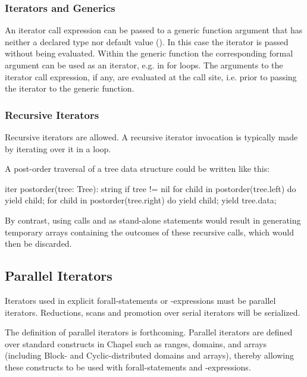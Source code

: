 \subsubsection{Iterators and Generics}
\label{Iterators_and_Generics}

An iterator call expression can be passed to a generic function argument that
has neither a declared type nor default value
().
In this case the iterator is passed without being evaluated.
Within the generic function the corresponding formal argument
can be used as an iterator, e.g. in for loops.
The arguments to the iterator call expression, if any, are evaluated
at the call site, i.e. prior to passing the iterator to the generic function.

\subsubsection{Recursive Iterators}
\label{Recursive_Iterators}

Recursive iterators are allowed. A recursive iterator invocation is
typically made by iterating over it in a loop.


\begin{example}
A post-order traversal of a tree data structure could be written like this:
\begin{chapel}
iter postorder(tree: Tree): string {
  if tree != nil {
    for child in postorder(tree.left) do
      yield child;
    for child in postorder(tree.right) do
      yield child;
    yield tree.data;
  }
}
\end{chapel}
By contrast, using calls 
and  as stand-alone statements would
result in generating temporary arrays containing the outcomes of these
recursive calls, which would then be discarded.
\end{example}

\subsection{Parallel Iterators}
\label{Parallel_Iterators}

Iterators used in explicit forall-statements or -expressions must be
parallel iterators.  Reductions, scans and promotion over serial
iterators will be serialized.

The definition of parallel iterators is forthcoming.  Parallel
iterators are defined over standard constructs in Chapel such as
ranges, domains, and arrays (including Block- and Cyclic-distributed
domains and arrays), thereby allowing these constructs to be used with
forall-statements and -expressions.
